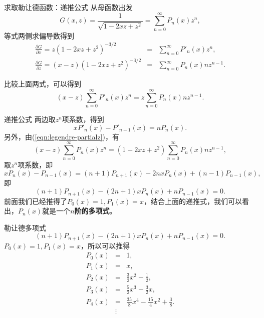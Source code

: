 \documentclass[11pt]{beamer}
\begin{document}
\begin{frame}{求取勒让德函数：递推公式}
从母函数出发
\begin{equation}
G(x,z) = \frac{1}{ \sqrt{1-2xz+z^2} } = \sum^\infty_{n=0} P_n(x) z^n,
\end{equation}
等式两侧求偏导数得到
\begin{eqnarray}
\frac{\partial G}{\partial x} = z(1-2xz+z^2)^{-3/2} &=& \sum^\infty_{n=0} P'_n(x) z^n,
\label{eqn:legendre-partialx}
\\
\frac{\partial G}{\partial z} = (x-z)(1-2xz+z^2)^{-3/2} &=& \sum^\infty_{n=0} P_n(x) n z^{n-1}.
\label{eqn:legendre-partialz}
\end{eqnarray}

比较上面两式，可以得到
\begin{equation}
(x-z) \sum^\infty_{n=0} P'_n(x) z^n = z \sum^\infty_{n=0} P_n(x) n z^{n-1}.
\end{equation}

\end{frame}

\begin{frame}{递推公式}
两边取$z^n$项系数，得到
\begin{equation}
xP'_n(x) - P'_{n-1}(x) = nP_n(x).
\label{eqn:legendre-recursion1}
\end{equation}
另外，由(\ref{eqn:legendre-partialz})，有
\begin{equation}
(x-z) \sum^\infty_{n=0} P_n(x) z^n = (1-2xz+z^2) \sum^\infty_{n=0} P_n(x) n z^{n-1},
\end{equation}
取$z^n$项系数，即
\begin{equation}
xP_n(x) - P_{n-1}(x) = (n+1)P_{n+1}(x) - 2nxP_n(x) + (n-1)P_{n-1}(x),
\end{equation}
即
\begin{equation}
(n+1) P_{n+1}(x) - (2n+1)xP_n(x) + nP_{n-1}(x) = 0.
\label{eqn:legendre-recursion2}
\end{equation}
前面我们已经推得了$P_0(x)=1, P_1(x)=x$，结合上面的递推式，我们可以看出，$P_n(x)$就是一个{\bf $n$阶的多项式}。
\end{frame}

\begin{frame}{勒让德多项式}
\begin{equation}
(n+1) P_{n+1}(x) - (2n+1)xP_n(x) + nP_{n-1}(x) = 0.
\end{equation}
$P_0(x)=1, P_1(x)=x$，所以可以推得
\begin{eqnarray}
P_0(x) &=& 1, \\
P_1(x) &=& x, \\
P_2(x) &=& \frac{3}{2}x^2 - \frac{1}{2}, \\
P_3(x) &=& \frac{5}{2}x^3 - \frac{3}{2}x, \\
P_4(x) &=& \frac{35}{8}x^4 - \frac{15}{4}x^2 + \frac{3}{8}. \\
&\vdots& \nonumber
\end{eqnarray}
\end{frame}
\end{document}
